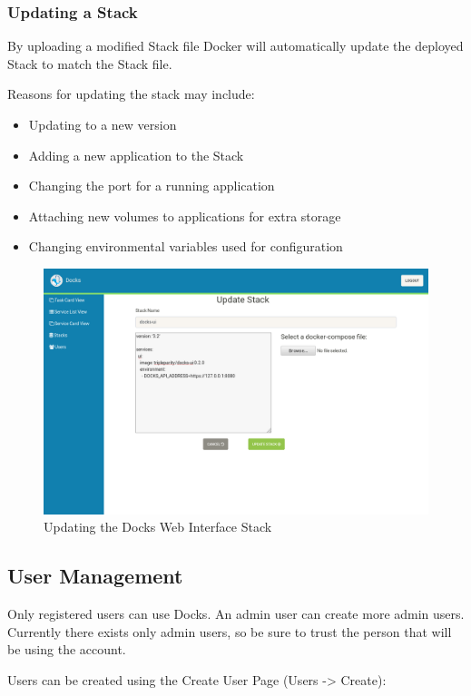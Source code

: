 \documentclass[]{article}
\begin{document}
\subsubsection{Updating a Stack}
\label{sec:stacks_update}

By uploading a modified Stack file Docker will automatically update the deployed
Stack to match the Stack file.

Reasons for updating the stack may include:
\begin{itemize}
	\item Updating to a new version
	\item Adding a new application to the Stack
	\item Changing the port for a running application
	\item Attaching new volumes to applications for extra storage
	\item Changing environmental variables used for configuration
\end{itemize}

\begin{figure}[H]
	\centering
	\includegraphics[scale=0.4]{stacks_update.png}
	\caption{Updating the Docks Web Interface Stack}
\end{figure}

\subsection{User Management}
\label{sec:user_management}
Only registered users can use Docks. An admin user can create more admin users.
Currently there exists only admin users, so be sure to trust the person that will
be using the account.

Users can be created using the Create User Page (Users -> Create):
\end{document}
